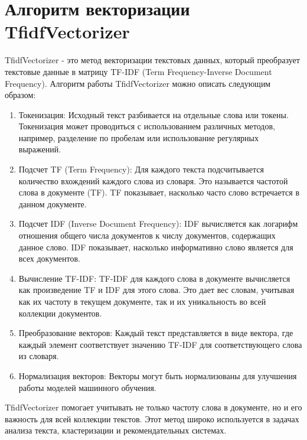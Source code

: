 \documentclass[12pt]{report}
\begin{document}
\section{Алгоритм векторизации TfidfVectorizer}
TfidfVectorizer - это метод векторизации текстовых данных, который преобразует текстовые данные в матрицу TF-IDF (Term Frequency-Inverse Document Frequency). Алгоритм работы TfidfVectorizer можно описать следующим образом:
\begin{enumerate}
    \item Токенизация: Исходный текст разбивается на отдельные слова или токены. Токенизация может проводиться с использованием различных методов, например, разделение по пробелам или использование регулярных выражений.

    \item  Подсчет TF (Term Frequency): Для каждого текста подсчитывается количество вхождений каждого слова из словаря. Это называется частотой слова в документе (TF). TF показывает, насколько часто слово встречается в данном документе.

    \item Подсчет IDF (Inverse Document Frequency): IDF вычисляется как логарифм отношения общего числа документов к числу документов, содержащих данное слово. IDF показывает, насколько информативно слово является для всех документов.

    \item Вычисление TF-IDF: TF-IDF для каждого слова в документе вычисляется как произведение TF и IDF для этого слова. Это дает вес словам, учитывая как их частоту в текущем документе, так и их уникальность во всей коллекции документов.

    \item Преобразование векторов: Каждый текст представляется в виде вектора, где каждый элемент соответствует значению TF-IDF для соответствующего слова из словаря.

    \item Нормализация векторов: Векторы могут быть нормализованы для улучшения работы моделей машинного обучения.
\end{enumerate}
TfidfVectorizer помогает учитывать не только частоту слова в документе, но и его важность для всей коллекции текстов. Этот метод широко используется в задачах анализа текста, кластеризации и рекомендательных системах.
\end{document}
